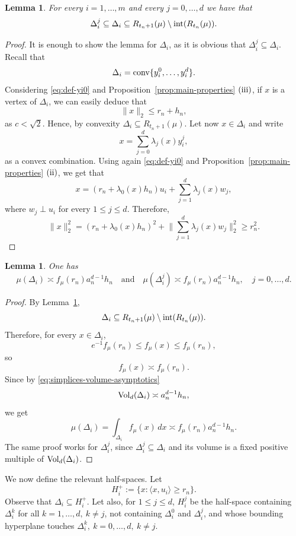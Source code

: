 \documentclass[10pt]{amsart}
\newcommand{\1}{\textbf{1}}
\newcommand{\conv}{{\rm conv}}
\newcommand{\vol}{{\rm Vol}}
\numberwithin{equation}{section} %
\newtheorem{lemma}[theorem]{Lemma}
\theoremstyle{remark}
\theoremstyle{definition}
\begin{document}
\begin{lemma}\label{lem:simplex-shell}
For every $i=1,\ldots,m$ and every $j=0,\ldots, d$ we have that
\[
\Delta_i^j \subseteq\Delta_i\subseteq R_{t_n+1}(\mu)\setminus {\rm int}(R_{t_n}(\mu)).
\]
\end{lemma}

\begin{proof}
It is enough to show the lemma for $\Delta_i$, as it is obvious that $\Delta_i^j \subseteq \Delta_i$. Recall that \[\Delta_i=\conv\{y_i^0,\ldots,y_i^d\}.\] Considering \eqref{eq:def-yi0} and Proposition~\ref{prop:main-properties} $\rm{(iii)}$, if $x$ is a vertex of $\Delta_i$, we can easily deduce that \[\|x\|_2 \leq r_n+h_n,\] as $c<\sqrt{2}$. Hence, by convexity $\Delta_i \subseteq R_{t_n+1}(\mu)$. Let now $x \in \Delta_i$ and write \[x=\sum_{j=0}^{d} \lambda_j(x) y_i^j,\] as a convex combination. Using again \eqref{eq:def-yi0} and Proposition~\ref{prop:main-properties} $\rm{(ii)}$, we get that \[x=(r_n+\lambda_0(x)h_n)u_i+\sum_{j=1}^d \lambda_j(x)w_j,\] where $w_j \perp u_i$ for every $1 \leq j \leq d$. Therefore, \[\|x\|_2^2=(r_n+\lambda_0(x)h_n)^2+\biggl\|\sum_{j=1}^d \lambda_j(x)w_j\biggr\|_2^2 \geq r_n^2.\] 
\end{proof}

\begin{lemma}\label{lem:simplex-mass}
One has
\[
\mu(\Delta_i)\asymp f_\mu(r_n)a_n^{d-1}h_n
\quad\text{and}\quad 
\mu(\Delta_i^j)\asymp f_\mu(r_n)a_n^{d-1}h_n ,
\quad j=0,\ldots,d.
\]
\end{lemma}

\begin{proof}
By Lemma~\ref{lem:simplex-shell},
\[
\Delta_i\subseteq R_{t_n+1}(\mu)\setminus {\rm int}(R_{t_n}(\mu)).
\]
Therefore, for every \(x\in\Delta_i\),
\begin{equation}\label{eq:simplices-f-asymptotics}
e^{-1}f_\mu(r_n)\le f_\mu(x)\le f_\mu(r_n),
\end{equation}
so
\[
f_\mu(x)\asymp f_\mu(r_n).
\]
Since by \eqref{eq:simplices-volume-asymptotics}
\[
\vol_d(\Delta_i)\asymp a_n^{d-1}h_n,
\]
we get
\[
\mu(\Delta_i)
=
\int_{\Delta_i}f_\mu(x)\,dx
\asymp
f_\mu(r_n)a_n^{d-1}h_n
.
\]
The same proof works for \(\Delta_i^j\), since \(\Delta_i^j\subseteq \Delta_i\) and its volume is a fixed positive multiple of \(\vol_d(\Delta_i)\).
\end{proof}


We now define the relevant half-spaces. Let
\[
H_i^+:=\{x:\langle x,u_i\rangle\ge r_n\}.
\]
Observe that $\Delta_i \subseteq H_i^+$. Let also, for $1 \leq j \leq d$, $H_i^j$ be the half-space containing $\Delta_i^k$ for all $k=1,\ldots,d, \ k \neq j$, not containing $\Delta_i^0$ and $\Delta_i^j$, and whose bounding hyperplane touches $\Delta_i^k, \ k=0,\ldots,d, \ k \neq j$. 
\end{document}
